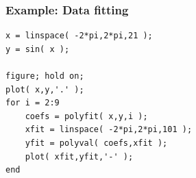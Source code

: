 \documentclass[11pt]{beamer}
\begin{document}
\begin{frame}[fragile]
  \frametitle{Example:  Data fitting}

  \begin{Verbatim}
x = linspace( -2*pi,2*pi,21 );
y = sin( x );

figure; hold on;
plot( x,y,'.' );
for i = 2:9
    coefs = polyfit( x,y,i );
    xfit = linspace( -2*pi,2*pi,101 );
    yfit = polyval( coefs,xfit );
    plot( xfit,yfit,'-' );
end
  \end{Verbatim}
\end{frame}

\end{document}
